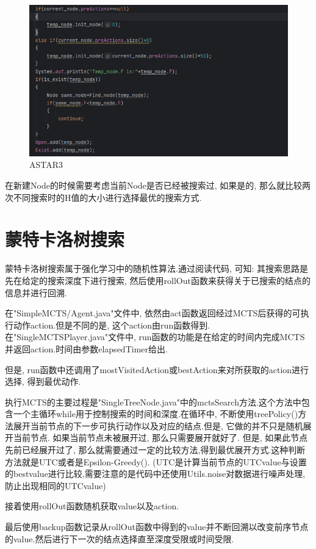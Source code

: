\documentclass{article}
\begin{document}
\begin{figure}
\centering
\includegraphics[width=0.6\linewidth]{ASTAR3}
\caption{ASTAR3}
\end{figure}
在新建Node的时候需要考虑当前Node是否已经被搜索过, 如果是的, 那么就比较两次不同搜索时的H值的大小进行选择最优的搜索方式.
\section{蒙特卡洛树搜索}
蒙特卡洛树搜索属于强化学习中的随机性算法.通过阅读代码, 可知: 其搜索思路是先在给定的搜索深度下进行搜索, 然后使用rollOut函数来获得关于已搜索的结点的信息并进行回溯.

在"SimpleMCTS/Agent.java"文件中, 依然由act函数返回经过MCTS后获得的可执行动作action.但是不同的是, 这个action由run函数得到. 在"SingleMCTSPlayer.java"文件中, run函数的功能是在给定的时间内完成MCTS并返回action.时间由参数elapsedTimer给出.

但是, run函数中还调用了mostVisitedAction或bestAction来对所获取的action进行选择, 得到最优动作.

执行MCTS的主要过程是"SingleTreeNode.java"中的mctsSearch方法.这个方法中包含一个主循环while用于控制搜索的时间和深度.在循环中, 不断使用treePolicy()方法展开当前节点的下一步可执行动作以及对应的结点.但是, 它做的并不只是随机展开当前节点. 如果当前节点未被展开过, 那么只需要展开就好了. 但是, 如果此节点先前已经展开过了, 那么就需要通过一定的比较方法,得到最优展开方式.这种判断方法就是UTC或者是Epsilon-Greedy().  (UTC是计算当前节点的UTCvalue与设置的bestvalue进行比较,需要注意的是代码中还使用Utils.noise对数据进行噪声处理,防止出现相同的UTCvalue)

接着使用rollOut函数随机获取value以及action.

最后使用backup函数记录从rollOut函数中得到的value并不断回溯以改变前序节点的value.然后进行下一次的结点选择直至深度受限或时间受限.
\end{document}
